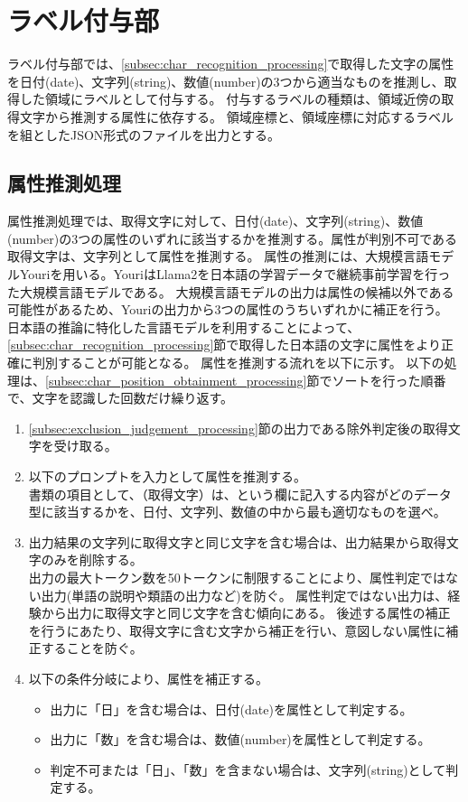 \section{ラベル付与部}\label{sec:label_link_part}
ラベル付与部では、\ref{subsec:char_recognition_processing}で取得した文字の属性を日付(date)、文字列(string)、数値(number)の3つから適当なものを推測し、取得した領域にラベルとして付与する。
付与するラベルの種類は、領域近傍の取得文字から推測する属性に依存する。
領域座標と、領域座標に対応するラベルを組としたJSON形式のファイルを出力とする。


\subsection{属性推測処理}\label{subsec:att_prediction_processing}
属性推測処理では、取得文字に対して、日付(date)、文字列(string)、数値(number)の3つの属性のいずれに該当するかを推測する。属性が判別不可である取得文字は、文字列として属性を推測する。
属性の推測には、大規模言語モデルYouriを用いる。YouriはLlama2を日本語の学習データで継続事前学習を行った大規模言語モデルである。
大規模言語モデルの出力は属性の候補以外である可能性があるため、Youriの出力から3つの属性のうちいずれかに補正を行う。
日本語の推論に特化した言語モデルを利用することによって、\ref{subsec:char_recognition_processing}節で取得した日本語の文字に属性をより正確に判別することが可能となる。
属性を推測する流れを以下に示す。
以下の処理は、\ref{subsec:char_position_obtainment_processing}節でソートを行った順番で、文字を認識した回数だけ繰り返す。\\

\begin{enumerate}
    \item \ref{subsec:exclusion_judgement_processing}節の出力である除外判定後の取得文字を受け取る。
    \item 以下のプロンプトを入力として属性を推測する。\\
        書類の項目として、（取得文字）は、という欄に記入する内容がどのデータ型に該当するかを、日付、文字列、数値の中から最も適切なものを選べ。
    \item 出力結果の文字列に取得文字と同じ文字を含む場合は、出力結果から取得文字のみを削除する。\\
        出力の最大トークン数を50トークンに制限することにより、属性判定ではない出力(単語の説明や類語の出力など)を防ぐ。
        属性判定ではない出力は、経験から出力に取得文字と同じ文字を含む傾向にある。
        後述する属性の補正を行うにあたり、取得文字に含む文字から補正を行い、意図しない属性に補正することを防ぐ。
    \item 以下の条件分岐により、属性を補正する。
        \begin{itemize}
            \item 出力に「日」を含む場合は、日付(date)を属性として判定する。
            \item 出力に「数」を含む場合は、数値(number)を属性として判定する。
            \item 判定不可または「日」、「数」を含まない場合は、文字列(string)として判定する。
        \end{itemize}
\end{enumerate}



